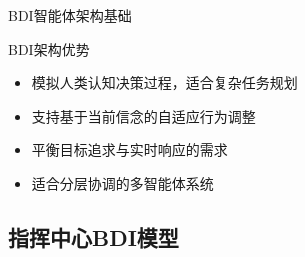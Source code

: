 \documentclass[
10pt,
aspectratio=169,
]{beamer}
\begin{document}
\begin{frame}{BDI智能体架构基础}
    \begin{exampleblock}{BDI架构优势}
        \begin{itemize}
            \item 模拟人类认知决策过程，适合复杂任务规划
            \item 支持基于当前信念的自适应行为调整
            \item 平衡目标追求与实时响应的需求
            \item 适合分层协调的多智能体系统
        \end{itemize}
    \end{exampleblock}
\end{frame}

\subsection{指挥中心BDI模型}
\end{document}
